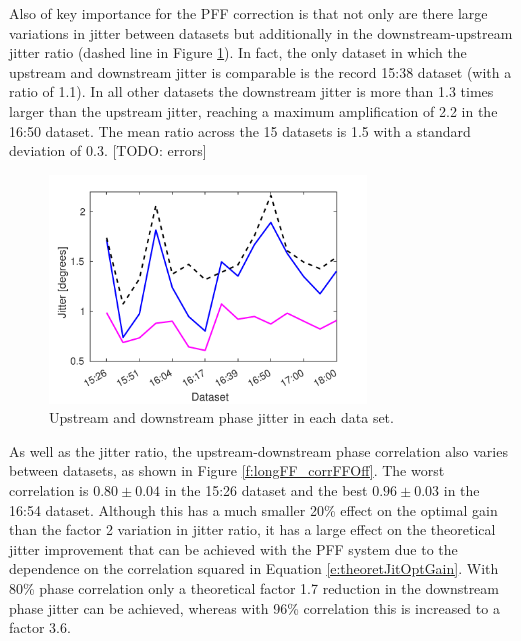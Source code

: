 Also of key importance for the PFF correction is that not only are there large variations in jitter between datasets but additionally in the downstream-upstream jitter ratio (dashed line in Figure \ref{f:longFF_jitFFOff}). In fact, the only dataset in which the upstream and downstream jitter is comparable is the record 15:38 dataset (with a ratio of 1.1). In all other datasets the downstream jitter is more than 1.3 times larger than the upstream jitter, reaching a maximum amplification of 2.2 in the 16:50 dataset. The mean ratio across the 15 datasets is 1.5 with a standard deviation of 0.3. [TODO: errors]

\begin{figure}
  \centering
  \includegraphics[width=0.75\textwidth]{Figures/feedforward/longFF_jitDatSetFFOff}
  \caption{Upstream and downstream phase jitter in each data set.}
  \label{f:longFF_jitFFOff}
\end{figure}

As well as the jitter ratio, the upstream-downstream phase correlation also varies between datasets, as shown in Figure \ref{f:longFF_corrFFOff}. The worst correlation is \(0.80\pm0.04\) in the 15:26 dataset and the best \(0.96\pm0.03\) in the 16:54 dataset. Although this has a much smaller 20\% effect on the optimal gain than the factor 2 variation in jitter ratio, it has a large effect on the theoretical jitter improvement that can be achieved with the PFF system due to the dependence on the correlation squared in Equation \ref{e:theoretJitOptGain}. With 80\% phase correlation only a theoretical factor 1.7 reduction in the downstream phase jitter can be achieved, whereas with 96\% correlation this is increased to a factor 3.6. 

